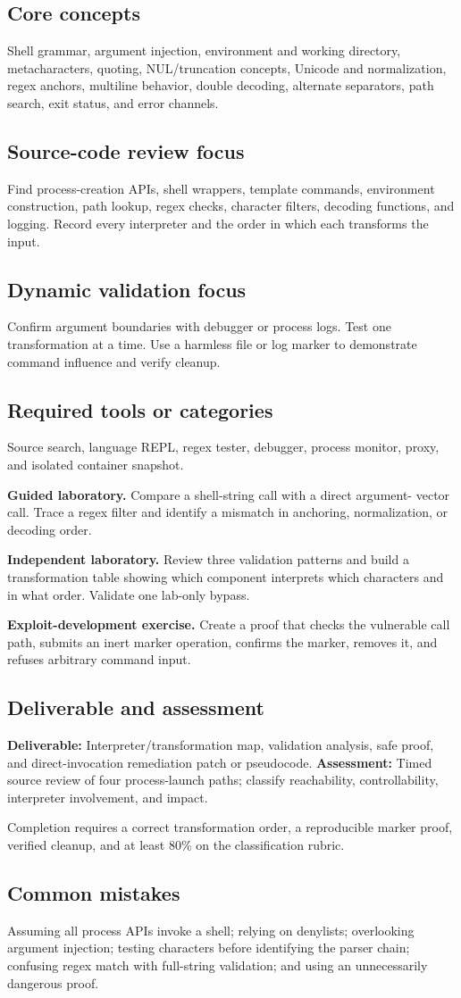 \documentclass[11pt]{article}
\newcommand{\weekfield}[2]{%
  \Needspace{5\baselineskip}
  \subsection*{#1}
  #2
}
\newcommand{\deliverable}[1]{\textbf{Deliverable:} #1}
\newcommand{\assessment}[1]{\textbf{Assessment:} #1}
\begin{document}
\weekfield{Core concepts}{Shell grammar, argument injection, environment and
working directory, metacharacters, quoting, NUL/truncation concepts, Unicode and
normalization, regex anchors, multiline behavior, double decoding, alternate
separators, path search, exit status, and error channels.}

\weekfield{Source-code review focus}{Find process-creation APIs, shell wrappers,
template commands, environment construction, path lookup, regex checks,
character filters, decoding functions, and logging. Record every interpreter and
the order in which each transforms the input.}

\weekfield{Dynamic validation focus}{Confirm argument boundaries with debugger
or process logs. Test one transformation at a time. Use a harmless file or log
marker to demonstrate command influence and verify cleanup.}

\weekfield{Required tools or categories}{Source search, language REPL, regex
tester, debugger, process monitor, proxy, and isolated container snapshot.}

\begin{labbox}
\textbf{Guided laboratory.} Compare a shell-string call with a direct argument-
vector call. Trace a regex filter and identify a mismatch in anchoring,
normalization, or decoding order.

\textbf{Independent laboratory.} Review three validation patterns and build a
transformation table showing which component interprets which characters and in
what order. Validate one lab-only bypass.

\textbf{Exploit-development exercise.} Create a proof that checks the vulnerable
call path, submits an inert marker operation, confirms the marker, removes it, and
refuses arbitrary command input.
\end{labbox}

\weekfield{Deliverable and assessment}{\deliverable{Interpreter/transformation
map, validation analysis, safe proof, and direct-invocation remediation patch or
pseudocode.} \assessment{Timed source review of four process-launch paths;
classify reachability, controllability, interpreter involvement, and impact.}}

\begin{checkpoints}
Completion requires a correct transformation order, a reproducible marker proof,
verified cleanup, and at least 80\% on the classification rubric.
\end{checkpoints}

\weekfield{Common mistakes}{Assuming all process APIs invoke a shell; relying on
denylists; overlooking argument injection; testing characters before identifying
the parser chain; confusing regex match with full-string validation; and using an
unnecessarily dangerous proof.}
\end{document}
